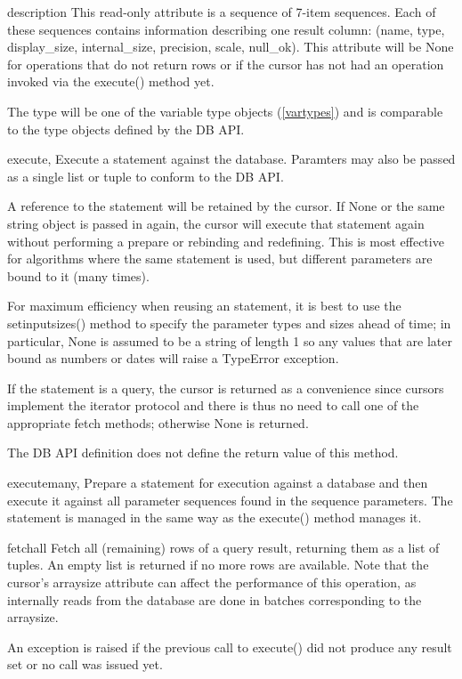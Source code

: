 \documentclass{manual}
\begin{document}
\begin{datadesc}{description}
  This read-only attribute is a sequence of 7-item sequences. Each of these
  sequences contains information describing one result column: (name, type,
  display_size, internal_size, precision, scale, null_ok). This attribute will
  be None for operations that do not return rows or if the cursor has not had
  an operation invoked via the execute() method yet.

  The type will be one of the variable type objects (\ref{vartypes}) and is
  comparable to the type objects defined by the DB API.
\end{datadesc}

\begin{funcdesc}{execute}{, {}}
  Execute a statement against the database. Paramters may also be passed as a
  single list or tuple to conform to the DB API.

  A reference to the statement will be retained by the cursor. If None or the
  same string object is passed in again, the cursor will execute that
  statement again without performing a prepare or rebinding and redefining.
  This is most effective for algorithms where the same statement is used, but
  different parameters are bound to it (many times).

  For maximum efficiency when reusing an statement, it is best to use the
  setinputsizes() method to specify the parameter types and sizes ahead of
  time; in particular, None is assumed to be a string of length 1 so any
  values that are later bound as numbers or dates will raise a TypeError
  exception.

  If the statement is a query, the cursor is returned as a convenience since
  cursors implement the iterator protocol and there is thus no need to call
  one of the appropriate fetch methods; otherwise None is returned.

   The DB API definition does not define the return value of this
  method.
\end{funcdesc}

\begin{funcdesc}{executemany}{, }
  Prepare a statement for execution against a database and then execute it
  against all parameter sequences found in the sequence parameters. The
  statement is managed in the same way as the execute() method manages it.
\end{funcdesc}

\begin{funcdesc}{fetchall}{}
  Fetch all (remaining) rows of a query result, returning them as a list of
  tuples. An empty list is returned if no more rows are available. Note that
  the cursor's arraysize attribute can affect the performance of this
  operation, as internally reads from the database are done in batches
  corresponding to the arraysize.

  An exception is raised if the previous call to execute() did not produce any
  result set or no call was issued yet.
\end{funcdesc}
\end{document}
